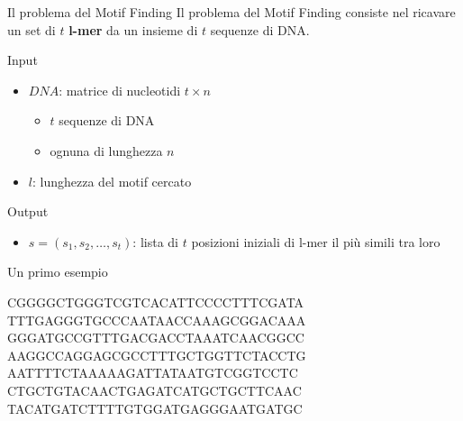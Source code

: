 	\begin{frame}{Il problema del Motif Finding}
		Il problema del Motif Finding consiste nel ricavare un set di $t$ \textbf{l-mer} da un insieme di $t$ sequenze di DNA.
		\begin{block}{Input}
			\begin{itemize}
				\item $DNA$: matrice di nucleotidi $t \times n$
				\begin{itemize}
					\item $t$ sequenze di DNA
					\item ognuna di lunghezza $n$
				\end{itemize}
				\item $l$: lunghezza del motif cercato
			\end{itemize}
		\end{block}
		\begin{block}{Output}
			\begin{itemize}
				\item $s=(s_1,s_2,\dots,s_t)$: lista di $t$ posizioni iniziali di l-mer il più simili tra loro
			\end{itemize}
		\end{block}
	\end{frame}
	
	\begin{frame}{Un primo esempio}
		\begin{center}
			CGGGGCTGGGTCGTCACATTCCCCTTTCGATA\\
			TTTGAGGGTGCCCAATAA\spot<2->[fill=yellow]{ATGCAACT}CCAAAGCGGACAAA\\
			GGGATGCCGTTTGACGACCTAAATCAACGGCC\\
			AAGGCCAGGAGCGCCTTTGCTGGTTCTACCTG\\
			AATTTTCTAAAAAGATTATAATGTCGGTCC\spot<2->[fill=yellow]{ATGCAACT}TC\\
			CTGCTGTACAACTGAGATCATGCTGC\spot<2->[fill=yellow]{ATGCAACT}TTCAAC\\
			TACATGATCTTTTGTGGATGAGGGAATGATGC
		\end{center}
	\end{frame}
	
